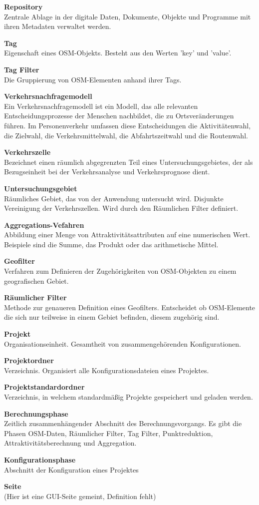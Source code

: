 \documentclass[parskip=full]{scrartcl} %
\begin{document}
\textbf{Repository}\\
Zentrale Ablage in der digitale Daten, Dokumente, Objekte und Programme mit ihren Metadaten verwaltet werden.

\textbf{Tag}\\
Eigenschaft eines OSM-Objekts. Besteht aus den Werten 'key' und 'value'.

\textbf{Tag Filter}\\
Die Gruppierung von OSM-Elementen anhand ihrer Tags.

\textbf{Verkehrsnachfragemodell}\\
Ein Verkehrsnachfragemodell ist ein Modell, das alle relevanten Entscheidungsprozesse der Menschen nachbildet, die zu Ortsveränderungen führen. Im Personenverkehr umfassen diese Entscheidungen die Aktivitätenwahl, die Zielwahl, die Verkehrsmittelwahl, die Abfahrtszeitwahl und die Routenwahl.

\textbf{Verkehrszelle}\\
Bezeichnet einen räumlich abgegrenzten Teil eines Untersuchungsgebietes, der als Bezugseinheit bei der Verkehrsanalyse und Verkehrsprognose dient.

\textbf{Untersuchungsgebiet}\\
Räumliches Gebiet, das von der Anwendung untersucht wird. Disjunkte Vereinigung der Verkehrszellen. Wird durch den Räumlichen Filter definiert.

\textbf{Aggregations-Vefahren}\\
Abbildung einer Menge von Attraktivitätsattributen auf eine numerischen Wert. Beispiele sind die Summe, das Produkt oder das arithmetische Mittel.

\textbf{Geofilter}\\
Verfahren zum Definieren der Zugehörigkeiten von OSM-Objekten zu einem geografischen Gebiet.

\textbf{Räumlicher Filter}\\
Methode zur genaueren Definition eines Geofilters. Entscheidet ob OSM-Elemente die sich nur teilweise in einem Gebiet befinden, diesem zugehörig sind.

\textbf{Projekt}\\
Organisationseinheit. Gesamtheit von zusammengehörenden Konfigurationen.

\textbf{Projektordner}\\
Verzeichnis. Organisiert alle Konfigurationsdateien eines Projektes.

\textbf{Projektstandardordner}\\
Verzeichnis, in welchem standardmäßig Projekte gespeichert und geladen werden.

\textbf{Berechnungsphase}\\
Zeitlich zusammenhängender Abschnitt des Berechnungsvorgangs. Es gibt die Phasen OSM-Daten, Räumlicher Filter, Tag Filter, Punktreduktion, Attraktivitätsberechnung und Aggregation.

\textbf{Konfigurationsphase}\\
Abschnitt der Konfiguration eines Projektes

\textbf{Seite}\\
(Hier ist eine GUI-Seite gemeint, Definition fehlt)
\end{document}
